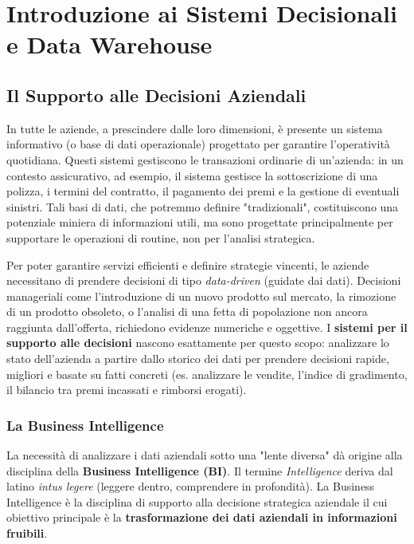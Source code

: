 \chapter{Introduzione ai Sistemi Decisionali e Data Warehouse}

\section{Il Supporto alle Decisioni Aziendali}

In tutte le aziende, a prescindere dalle loro dimensioni, è presente un sistema informativo (o base di dati operazionale) progettato per garantire l'operatività quotidiana. Questi sistemi gestiscono le transazioni ordinarie di un'azienda: in un contesto assicurativo, ad esempio, il sistema gestisce la sottoscrizione di una polizza, i termini del contratto, il pagamento dei premi e la gestione di eventuali sinistri. Tali basi di dati, che potremmo definire "tradizionali", costituiscono una potenziale miniera di informazioni utili, ma sono progettate principalmente per supportare le operazioni di routine, non per l'analisi strategica.

Per poter garantire servizi efficienti e definire strategie vincenti, le aziende necessitano di prendere decisioni di tipo \textit{data-driven} (guidate dai dati). Decisioni manageriali come l'introduzione di un nuovo prodotto sul mercato, la rimozione di un prodotto obsoleto, o l'analisi di una fetta di popolazione non ancora raggiunta dall'offerta, richiedono evidenze numeriche e oggettive.
I \textbf{sistemi per il supporto alle decisioni} nascono esattamente per questo scopo: analizzare lo stato dell'azienda a partire dallo storico dei dati per prendere decisioni rapide, migliori e basate su fatti concreti (es. analizzare le vendite, l'indice di gradimento, il bilancio tra premi incassati e rimborsi erogati).

\subsection{La Business Intelligence}
La necessità di analizzare i dati aziendali sotto una "lente diversa" dà origine alla disciplina della \textbf{Business Intelligence (BI)}. Il termine \textit{Intelligence} deriva dal latino \textit{intus legere} (leggere dentro, comprendere in profondità).
La Business Intelligence è la disciplina di supporto alla decisione strategica aziendale il cui obiettivo principale è la \textbf{trasformazione dei dati aziendali in informazioni fruibili}.

